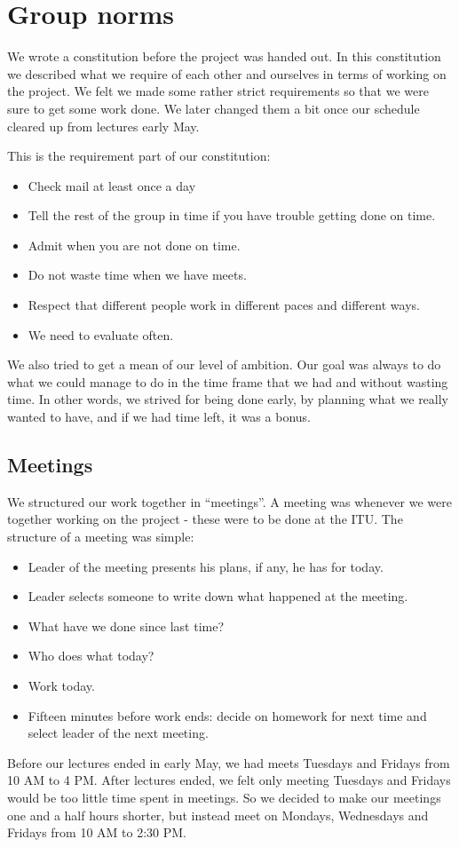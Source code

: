 \chapter{Group norms}
We wrote a constitution before the project was handed out. In this
constitution we described what we require of each other and ourselves in terms of
working on the project. We felt we made some rather strict requirements so that
we were sure to get some work done. We later changed
them a bit once our schedule cleared up from lectures early May.

This is the requirement part of our constitution:
\begin{itemize}
  \item Check mail at least once a day
  \item Tell the rest of the group in time if you have trouble getting done on
  time.
  \item Admit when you are not done on time.
  \item Do not waste time when we have meets.
  \item Respect that different people work in different paces and different
  ways.
  \item We need to evaluate often.
\end{itemize}

We also tried to get a mean of our level of ambition. Our goal was always to do
what we could manage to do in the time frame that we had and without wasting
time. In other words, we strived for being done early, by planning what we really 
wanted to have, and if we had time left, it was a bonus.

\section{Meetings}
\label{GN-M}
We structured our work together in ``meetings''. A meeting was whenever we were
together working on the project - these were to be done at the ITU. The
structure of a meeting was simple:
\begin{itemize}
  \item Leader of the meeting presents his plans, if any, he has for today. 
  \item Leader selects someone to write down what happened at the meeting.
  \item What have we done since last time?
  \item Who does what today?
  \item Work today.
  \item Fifteen minutes before work ends: decide on homework for next time and
  select leader of the next meeting.
\end{itemize}
Before our lectures ended in early May, we had meets Tuesdays and Fridays from
10 AM to 4 PM. After lectures ended, we felt only meeting Tuesdays and Fridays
would be too little time spent in meetings. So we decided to make our meetings
one and a half hours shorter, but instead meet on Mondays, Wednesdays and
Fridays from 10 AM to 2:30 PM.
